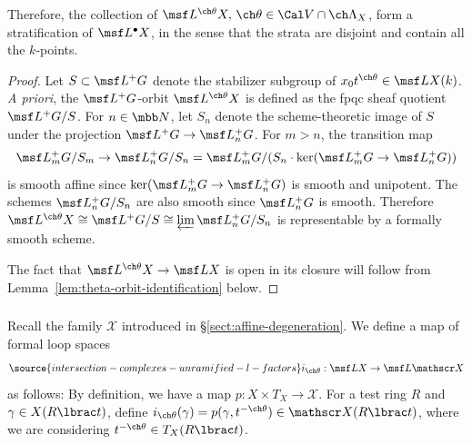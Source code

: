 Therefore, the collection of
$\msf L^{\ch\theta}X,\, \ch\theta \in \Cal V \cap \ch\Lambda_X$,
form a stratification of $\msf L^\bullet X$, in the sense that the strata are disjoint
and contain all the $k$-points.

\begin{proof}
Let $S \subset \msf L^+G$ denote the stabilizer subgroup of $x_0 t^{\ch\theta}
\in \msf L X(k)$.
\emph{A priori}, the $\msf L^+G$-orbit $\msf L^{\ch\theta} X$ is
defined as the fpqc sheaf quotient $\msf L^+G/S$.
For $n \in \mbb N$, let $S_n$ denote the scheme-theoretic image
of $S$ under the projection $\msf L^+G \to \msf L^+_n G$.
For $m > n$, the transition map
\[ \msf L^+_m G / S_m \to \msf L^+_n G / S_n = \msf L^+_m G / (S_n \cdot \ker(\msf L^+_m G \to \msf L^+_n G)) \]
is smooth affine since $\ker(\msf L^+_m G \to \msf L^+_n G)$ is smooth and unipotent.
The schemes $\msf L^+_n G/S_n$ are also smooth since $\msf L^+_n G$ is smooth.
Therefore $\msf L^{\ch\theta} X \cong \msf L^+ G / S \cong \varprojlim
\msf L^+_n G / S_n$ is representable by a formally smooth scheme.

The fact that $\msf L^{\ch\theta} X \to \msf L X$ is open in its closure
will follow from Lemma~\ref{lem:theta-orbit-identification} below.
\end{proof}



\subsubsection{}
Recall the family $\mathscr X$ introduced in \S \ref{sect:affine-degeneration}. We define a map of formal loop spaces
\begin{equation}\label{e:ithetaLX}
\source{intersection-complexes-unramified-l-factors}
    i_{\ch\theta} : \msf L X \to \msf L \mathscr X
\end{equation}
as follows:
By definition, we have a map $p: X \times T_X \to \mathscr X$.
For a test ring $R$ and $\gamma \in X( R \lbrac t)$,
define $i_{\ch\theta}(\gamma) = p( \gamma, t^{-\ch\theta} ) \in \mathscr X(R \lbrac t)$,
where we are considering $t^{-\ch\theta} \in T_X(R \lbrac t)$.

